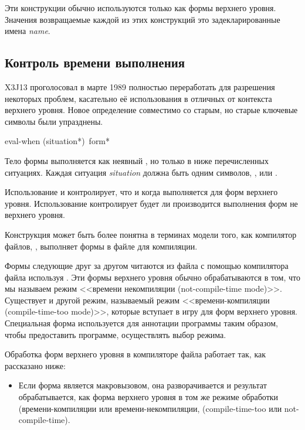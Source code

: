 \begin{defmac}
Эти конструкции обычно используются только как формы верхнего уровня. Значения
возвращаемые каждой из этих конструкций это задекларированные имена \emph{name}.
\end{defmac}

\subsection{Контроль времени выполнения}

\begin{newer}
X3J13 проголосовал в марте 1989 
полностью переработать  для разрешения некоторых проблем, касательно её
использования в отличных от контекста верхнего уровня. Новое определение
совместимо со старым, но старые ключевые символы были упразднены.

\begin{defspec}
eval-when ({situation}*) {\,form}*

  Тело формы  выполняется как неявный , но только в
  ниже перечисленных ситуациях. Каждая ситуация \emph{situation} должна быть
  одним символов, ,  или .


  Использование  и  контролирует, что и
  когда выполняется для форм верхнего уровня. Использование 
  контролирует будет ли производится выполнения форм не верхнего уровня.

  Конструкция  может быть более понятна в терминах модели того,
  как компилятор файлов, , выполняет формы в файле для
  компиляции.

  Формы следующие друг за другом читаются из файла с помощью компилятора файла
  используя . Эти формы верхнего уровня обычно обрабатываются в том,
  что мы называем режим <<времени некомпиляции (not-compile-time
  mode)>>. Существует и другой режим, называемый режим <<времени-компиляции
  (compile-time-too mode)>>, которые вступает в игру для форм верхнего
  уровня. Специальная форма  используется для аннотации программы
  таким образом, чтобы предоставить программе, осуществлять выбор режима.

  Обработка форм верхнего уровня в компиляторе файла работает так, как
  рассказано ниже:

\begin{itemize}

   \item Если форма является макровызовом, она разворачивается и результат
     обрабатывается, как форма верхнего уровня в том же режиме обработки
     (времени-компиляции или времени-некомпиляции, (compile-time-too или not-compile-time).


\end{itemize}
\end{defspec}
\end{newer}
